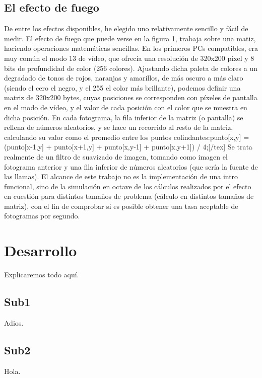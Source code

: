 \documentclass[a4,12pt]{article}
\begin{document}
\subsection{El efecto de fuego}
De entre los efectos disponibles, he elegido uno relativamente sencillo y fácil de medir. El efecto de fuego que puede verse en la figura 1, trabaja sobre una matiz, haciendo operaciones matemáticas sencillas. En los primeros PCs compatibles, era muy común el modo 13 de vídeo, que ofrecía una resolución de 320x200 pixel y 8 bits de profundidad de color (256 colores). Ajustando dicha paleta de colores a un degradado de tonos de rojos, naranjas y amarillos, de más oscuro a más claro (siendo el cero el negro, y el 255 el color más brillante), podemos definir una matriz de 320x200 bytes, cuyas posiciones se corresponden con píxeles de pantalla en el modo de vídeo, y el valor de cada posición con el color que se muestra en dicha posición.
\newline
\newline
En cada fotograma, la fila inferior de la matriz (o pantalla) se rellena de números aleatorios, y se hace un recorrido al resto de la matriz, calculando su valor como el promedio entre los puntos colindantes:\newline
[tex]punto[x,y] = (punto[x-1,y] + punto[x+1,y] + punto[x,y-1] + punto[x,y+1]) / 4;[/tex] \newline
Se trata realmente de un filtro de suavizado de imagen, tomando como imagen el fotograma anterior y una fila inferior de números aleatorios (que sería la fuente de las llamas).
\newline
\newline
El alcance de este trabajo no es la implementación de una intro funcional, sino de la simulación en octave de los cálculos realizados por el efecto en cuestión para distintos tamaños de problema (cálculo en distintos tamaños de matriz), con el fin de comprobar si es posible obtener una tasa aceptable de fotogramas por segundo.

\section{Desarrollo}

Explicaremos todo aquí.

\subsection{Sub1}

Adios.

\subsection{Sub2}

Hola.


%
%
\end{document}
